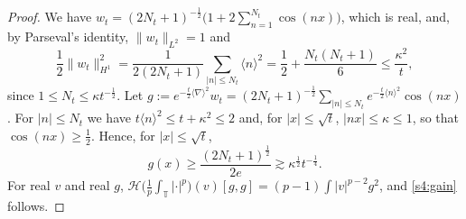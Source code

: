 \documentclass[letterpaper, 11pt,  reqno]{amsart}
\theoremstyle{definition}
\newcommand{\1}{\mathbbm 1}
\newcommand{\T}{\mathbb{T}}
\newcommand{\0}{\mathbf 0}
\newcommand{\nb}{\nabla}
\newcommand{\ges}{\gtrsim}
\newcommand{\jb}[1]
{\langle #1 \rangle}
\numberwithin{equation}{section}
\numberwithin{theorem}{section}
\newcommand{\HF}[2]{\mathcal H\big(\tfrac1p{\textstyle\int_\T}|\cdot|^p\big)(#1)[#2]}
\begin{document}
\begin{proof}
We have $w_t=(2N_t+1)^{-\frac12}\big(1+2\sum_{n=1}^{N_t}\cos(nx)\big)$, which is real, and, by
Parseval's identity, $\|w_t\|_{L^2}=1$ and
\[
\frac12\|w_t\|_{H^1}^2=\frac1{2(2N_t+1)}\sum_{|n|\le N_t}\jb n^2=\frac12+\frac{N_t(N_t+1)}6\le\frac{\kappa^2}t,
\]
since $1\le N_t\le\kappa t^{-\frac12}$. Let
$g:=e^{-\frac t2\jb\nb^2}w_t=(2N_t+1)^{-\frac12}\sum_{|n|\le N_t}e^{-\frac t2\jb n^2}\cos(nx)$.
For $|n|\le N_t$ we have $t\jb n^2\le t+\kappa^2\le2$ and, for $|x|\le\sqrt t$, $|nx|\le\kappa\le1$, so that
$\cos(nx)\ge\frac12$. Hence, for $|x|\le\sqrt t$,
\[
g(x)\ge\frac{(2N_t+1)^{\frac12}}{2e}\ges\kappa^{\frac12}t^{-\frac14}.
\]
For real $v$ and real $g$, $\HF{v}{g,g}=(p-1)\int|v|^{p-2}g^2$, and \eqref{s4:gain} follows.
\end{proof}
\end{document}
